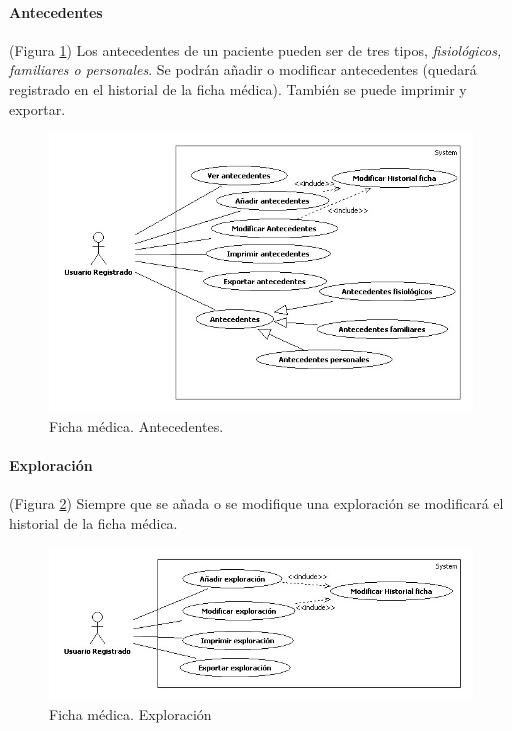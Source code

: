 \documentclass[a4paper,oneside,11pt]{book}
\begin{document}
			\paragraph{Antecedentes} %
			\label{par:antecedentes}
				(Figura \ref{fig:ant_fic}) Los antecedentes de un paciente pueden ser de tres tipos, \textit{fisiológicos, familiares o personales}. Se podrán añadir o modificar antecedentes (quedará registrado en el historial de la ficha médica). También se puede imprimir y exportar.
				\begin{figure}[H]
				  \centering
				    \includegraphics[width=14cm]{img/jpg/casos_uso/Antecedentes.jpg}
				  \caption{Ficha médica. Antecedentes.}
				  \label{fig:ant_fic}
				\end{figure}
			
			\paragraph{Exploración} %
			\label{par:exploracion}
				(Figura \ref{fig:exp_fic}) Siempre que se añada o se modifique una exploración se modificará el historial de la ficha médica.
				\begin{figure}[H]
				  \centering
				    \includegraphics[width=14cm]{img/jpg/casos_uso/Exploracion.jpg}
				  \caption{Ficha médica. Exploración}
				  \label{fig:exp_fic}
				\end{figure}
			
\end{document}
